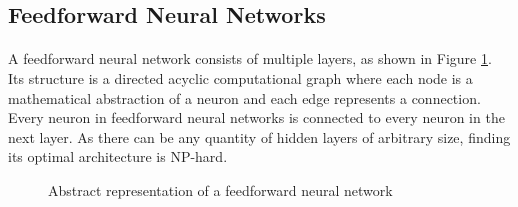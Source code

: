 \documentclass[12pt,a4paper]{book}
\begin{document}
\subsection{Feedforward Neural Networks}

\paragraph{} A feedforward neural network consists of multiple layers, as shown in Figure \ref{network}. Its structure is a directed acyclic computational graph where each node is a mathematical abstraction of a neuron and each edge represents a connection. Every neuron in feedforward neural networks is connected to every neuron in the next layer. As there can be any quantity of hidden layers of arbitrary size, finding its optimal architecture is NP-hard.

\begin{figure}[ht!]
  \label{network}
  \caption{Abstract representation of a feedforward neural network}
  \centering
\end{figure}
\end{document}
